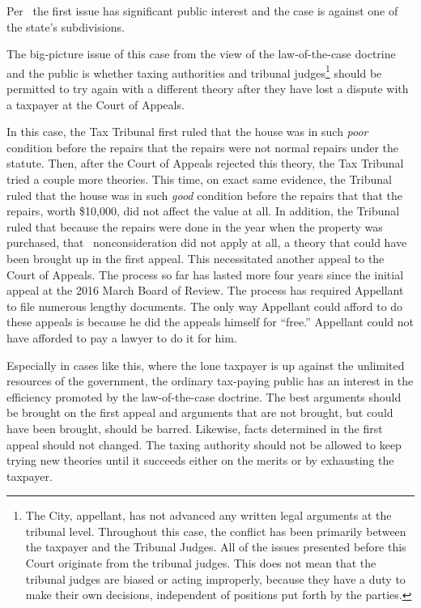 \documentclass[12pt,\documentclassflag]{michiganCourtOfAppealsBrief}
\begin{document}
Per \cite{MCR 7.305(B)(2)}\ the first issue has significant public interest and the case is against one of the state's subdivisions.

The big-picture issue of this case from the view of the law-of-the-case doctrine and the public is whether taxing authorities and tribunal judges\footnote{The City, appellant, has not advanced any written legal arguments at the tribunal level. Throughout this case, the conflict has been primarily between the taxpayer and the Tribunal Judges. All of the issues presented before this Court originate from the tribunal judges. This does not mean that the tribunal judges are biased or acting improperly, because they have a duty to make their own decisions, independent of positions put forth by the parties.} should be permitted to try again with a different theory after they have lost a dispute with a taxpayer at the Court of Appeals.

In this case, the Tax Tribunal first ruled that the house was in such \emph{poor} condition before the repairs that the repairs were not normal repairs under the statute. Then, after the Court of Appeals rejected this theory, the Tax Tribunal tried a couple more theories. This time, on exact same evidence, the Tribunal ruled that the house was in such \emph{good} condition before the repairs that that the repairs, worth \$10,000, did not affect the value at all. In addition, the Tribunal ruled that because the repairs were done in the year when the property was purchased, that \mathieuGast\ nonconsideration did not apply at all, a theory that could have been brought up in the first appeal. This necessitated another appeal to the Court of Appeals. The process so far has lasted more four years since the initial appeal at the 2016 March Board of Review. The process has required Appellant to file numerous lengthy documents. The only way Appellant could afford to do these appeals is because he did the appeals himself for ``free.'' Appellant could not have afforded to pay a lawyer to do it for him.

Especially in cases like this, where the lone taxpayer is up against the unlimited resources of the government, the ordinary tax-paying public has an interest in the efficiency promoted by the law-of-the-case doctrine. The best arguments should be brought on the first appeal and arguments that are not brought, but could have been brought, should be barred. Likewise, facts determined in the first appeal should not changed. The taxing authority should not be allowed to keep trying new theories until it succeeds either on the merits or by exhausting the taxpayer. 
\end{document}

